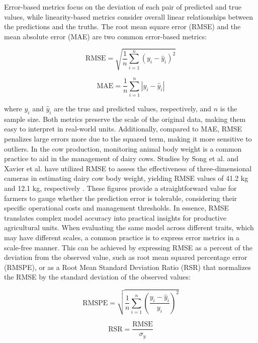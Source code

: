 Error-based metrics focus on the deviation of each pair of predicted and true values, while linearity-based metrics consider overall linear relationships between the predictions and the truths. The root mean square error (RMSE) and the mean absolute error (MAE) are two common error-based metrics:

\begin{equation} \label{eq_rmse}
\text{RMSE} = \sqrt{\frac{1}{n} \sum_{i=1}^{n} (y_i - \hat{y}_i)^2}
\end{equation}

\begin{equation} \label{eq_mae}
    \text{MAE} = \frac{1}{n} \sum_{i=1}^{n} |y_i - \hat{y}_i|
\end{equation}

where $y_i$ and $\hat{y}_i$ are the true and predicted values, respectively, and $n$ is the sample size. Both metrics preserve the scale of the original data, making them easy to interpret in real-world units. Additionally, compared to MAE, RMSE penalizes large errors more due to the squared term, making it more sensitive to outliers. In the cow production, monitoring animal body weight is a common practice to aid in the management of dairy cows. Studies by Song et al. and Xavier et al. have utilized RMSE to assess the effectiveness of three-dimensional cameras in estimating dairy cow body weight, yielding RMSE values of 41.2 kg and 12.1 kg, respectively \citep{song_automated_2018,xavier_use_2022}. These figures provide a straightforward value for farmers to gauge whether the prediction error is tolerable, considering their specific operational costs and management thresholds. In essence, RMSE translates complex model accuracy into practical insights for productive agricultural units.
When evaluating the same model across different traits, which may have different scales, a common practice is to express error metrics in a scale-free manner. This can be achieved by expressing RMSE as a percent of the deviation from the observed value, such as root mean squared percentage error (RMSPE), or as a Root Mean Standard Deviation Ratio (RSR) that normalizes the RMSE by the standard deviation of the observed values:

\begin{equation} \label{eq_rmspe}
    \text{RMSPE} = \sqrt{\frac{1}{n} \sum_{i=1}^{n} (\frac{y_i - \hat{y}_i}{y_i})^2}
\end{equation}

\begin{equation} \label{eq_rsr}
    \text{RSR} = \frac{\text{RMSE}}{\sigma_y}
\end{equation}

